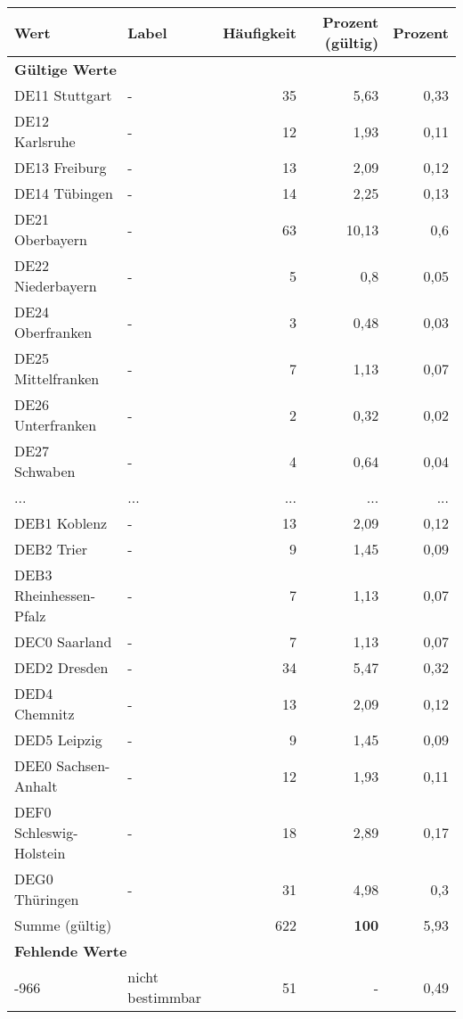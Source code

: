      \begin{longtable}{Xlrrr}
     \toprule
     \textbf{Wert} & \textbf{Label} & \textbf{Häufigkeit} & \textbf{Prozent (gültig)} & \textbf{Prozent} \\
     \endhead
     \midrule
     \multicolumn{5}{l}{\textbf{Gültige Werte}}\\
        \multicolumn{1}{X}{DE11 Stuttgart} & - & 35 & 5,63 & 0,33 \\
        \multicolumn{1}{X}{DE12 Karlsruhe} & - & 12 & 1,93 & 0,11 \\
        \multicolumn{1}{X}{DE13 Freiburg} & - & 13 & 2,09 & 0,12 \\
        \multicolumn{1}{X}{DE14 Tübingen} & - & 14 & 2,25 & 0,13 \\
        \multicolumn{1}{X}{DE21 Oberbayern} & - & 63 & 10,13 & 0,6 \\
        \multicolumn{1}{X}{DE22 Niederbayern} & - & 5 & 0,8 & 0,05 \\
        \multicolumn{1}{X}{DE24 Oberfranken} & - & 3 & 0,48 & 0,03 \\
        \multicolumn{1}{X}{DE25 Mittelfranken} & - & 7 & 1,13 & 0,07 \\
        \multicolumn{1}{X}{DE26 Unterfranken} & - & 2 & 0,32 & 0,02 \\
        \multicolumn{1}{X}{DE27 Schwaben} & - & 4 & 0,64 & 0,04 \\
       ... & ... & ... & ... & ... \\
        \multicolumn{1}{X}{DEB1 Koblenz} & - & 13 & 2,09 & 0,12 \\
        \multicolumn{1}{X}{DEB2 Trier} & - & 9 & 1,45 & 0,09 \\
        \multicolumn{1}{X}{DEB3 Rheinhessen-Pfalz} & - & 7 & 1,13 & 0,07 \\
        \multicolumn{1}{X}{DEC0 Saarland} & - & 7 & 1,13 & 0,07 \\
        \multicolumn{1}{X}{DED2 Dresden} & - & 34 & 5,47 & 0,32 \\
        \multicolumn{1}{X}{DED4 Chemnitz} & - & 13 & 2,09 & 0,12 \\
        \multicolumn{1}{X}{DED5 Leipzig} & - & 9 & 1,45 & 0,09 \\
        \multicolumn{1}{X}{DEE0 Sachsen-Anhalt} & - & 12 & 1,93 & 0,11 \\
        \multicolumn{1}{X}{DEF0 Schleswig-Holstein} & - & 18 & 2,89 & 0,17 \\
        \multicolumn{1}{X}{DEG0 Thüringen} & - & 31 & 4,98 & 0,3 \\
     \midrule
      \multicolumn{2}{l}{Summe (gültig)} & 622 &
      \textbf{100} &
         5,93 \\
     \multicolumn{5}{l}{\textbf{Fehlende Werte}}\\
       -966 & nicht bestimmbar & 51 & - & 0,49 \\


\end{longtable}
